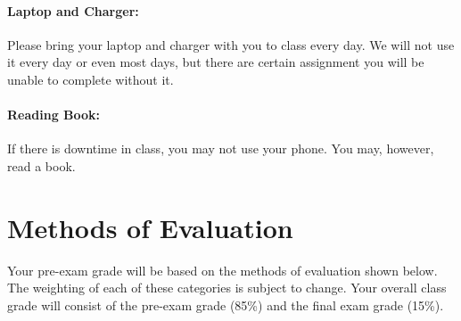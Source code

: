 \documentclass[10pt]{exam}
\begin{document}
\paragraph{Laptop and Charger:}
	Please bring your laptop and charger with you to class every day.  We will not use it every day or even most days, but there are certain assignment you will be unable to complete without it.	

\paragraph{Reading Book:}
	If there is downtime in class, you may not use your phone.  You may, however, read a book.


\section*{Methods of Evaluation}

Your pre-exam grade will be based on the methods of 
evaluation shown below. The weighting of each of these 
categories is subject to change. Your overall class 
grade will consist of the pre-exam grade (85\%) and the
final exam grade (15\%).
\end{document}
